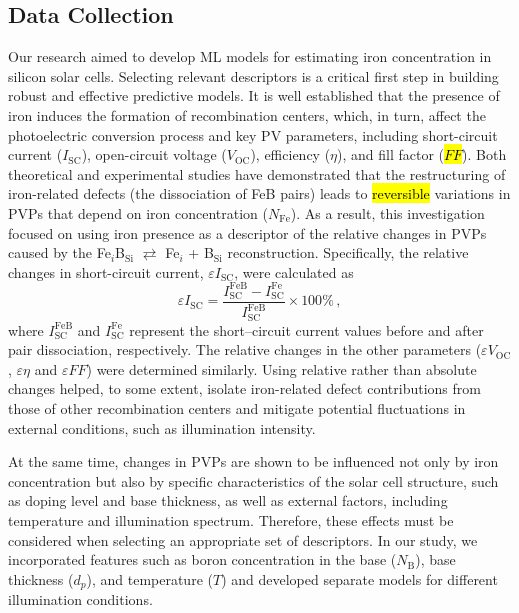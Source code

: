 \documentclass[a4paper,fleqn,draft]{cas-sc}
\begin{document}
\subsection{Data Collection}\label{SecDataCol}

Our research aimed to develop ML models for estimating iron concentration in silicon solar cells.
Selecting relevant descriptors is a critical first step in building robust and effective predictive models.
It is well established that the presence of iron induces the formation of recombination centers, which, in turn, affect the photoelectric conversion process and key PV parameters,
including short-circuit current ($I_\mathrm{SC}$), open-circuit voltage ($V_\mathrm{OC}$), efficiency ($\eta$), and fill factor
(\textcolor[rgb]{1.00,0.07,0.00}{\hl{$F\!F$}}).
Both theoretical and experimental studies \cite{FeB:Schmidt,IronSC,Olikh2025MSEB} have demonstrated that the restructuring of iron-related defects (the dissociation of FeB pairs)
leads to
\textcolor[rgb]{1.00,0.07,0.00}{
\hl{
reversible
}}
variations in PVPs that depend on iron concentration ($N_\mathrm{Fe}$).
As a result, this investigation focused on using iron presence as a descriptor of the relative changes in PVPs caused by the
Fe$_i$B$_\mathrm{Si}$ $\rightleftarrows$ Fe$_i$ + B$_\mathrm{Si}$ reconstruction.
Specifically, the relative changes in short-circuit current, $\varepsilon I_\mathrm{SC}$, were calculated as
\begin{equation}
\label{eq1}
    \varepsilon I_\mathrm{SC} = \frac{I_\mathrm{SC}^\mathrm{FeB} - I_\mathrm{SC}^\mathrm{Fe}}{I_\mathrm{SC}^\mathrm{FeB}} \times 100 \%\,,
\end{equation}
where $I_\mathrm{SC}^\mathrm{FeB}$ and $I_\mathrm{SC}^\mathrm{Fe}$ represent the short--circuit current values before and after pair dissociation, respectively.
The relative changes in the other parameters ($\varepsilon V_\mathrm{OC}$, $\varepsilon \eta$ and $\varepsilon F\!F$) were determined similarly.
Using relative rather than absolute changes helped, to some extent,
isolate iron-related defect contributions from those of other recombination centers
and mitigate potential fluctuations in external conditions, such as illumination intensity.

At the same time, changes in PVPs are shown \cite{FeB:Schmidt,Olikh2025MSEB} to be influenced not only by iron concentration
but also by specific characteristics of the solar cell structure, such as doping level and base thickness,
as well as external factors, including temperature and illumination spectrum.
Therefore, these effects must be considered when selecting an appropriate set of descriptors.
In our study, we incorporated features such as boron concentration in the base ($N_\mathrm{B}$), base thickness ($d_p$), and temperature ($T$)
and developed separate models for different illumination conditions.
\end{document}
